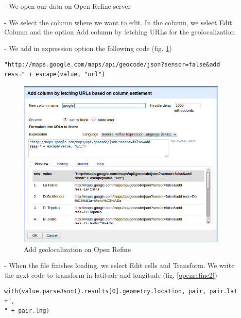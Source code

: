 \documentclass[10pt,a4paper]{article}
\begin{document}
\begin{itemize}
\item[-] We open our data on Open Refine server
\item[-] We select the column where we want to edit. In the column, we select Edit Column and the option Add column by fetching URLs for the geolocalization
\item[-]We add in expression option the following code (fig. \ref{openrefine1}) 
\begin{verbatim}
"http://maps.google.com/maps/api/geocode/json?sensor=false&add
ress=" + escape(value, "url")
\end{verbatim}

\begin{figure}[htp]
\centering
\includegraphics[scale=0.30]{openrefine1.png}
\caption{Add geolocalization on Open Refine}
\label{openrefine1}
\end{figure}

\item[-] When the file finishes loading,  we select Edit cells and Transform. We write the next code to transform in latitude and longitude (fig. \ref{openrefine2})
\begin{verbatim}
with(value.parseJson().results[0].geometry.location, pair, pair.lat +",
" + pair.lng)
\end{verbatim}


\end{itemize}
\end{document}
